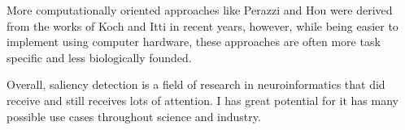 \documentclass[a4paper,12pt,fleqn,oneside]{scrartcl}
\begin{document}
More computationally oriented approaches like Perazzi and Hou were derived from the works of Koch and Itti in recent years,
however, while being easier to implement using computer hardware, these approaches are often more task specific and
less biologically founded.

Overall, saliency detection is a field of research in neuroinformatics that did receive and still receives lots of
attention. I has great potential for it has many possible use cases throughout science and industry.


\newpage
\nocite{*}



\listoffigures

\listoftables
\end{document}
